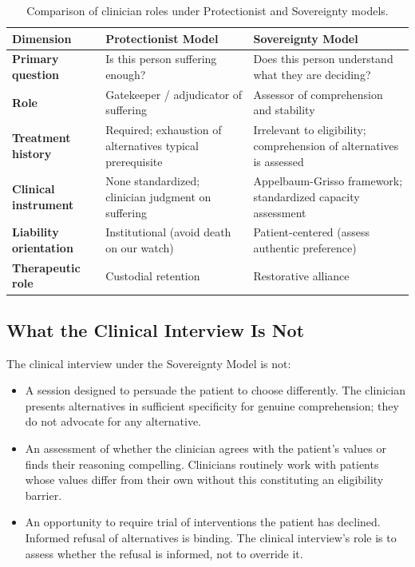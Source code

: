 \documentclass[11pt, letterpaper]{article}
\begin{document}
\begin{table}[h!]
\centering
\small
\renewcommand{\arraystretch}{1.5}
\begin{tabularx}{\textwidth}{>{\sffamily\bfseries\small}p{3.2cm} X X}
\toprule
\rowcolor{C@accent}
{\color{white}\sffamily\bfseries Dimension} &
{\color{white}\sffamily\bfseries Protectionist Model} &
{\color{white}\sffamily\bfseries Sovereignty Model} \\
\midrule
Primary question
  & Is this person suffering enough?
  & Does this person understand what they are deciding? \\
\rowcolor{C@accentlight}
Role
  & Gatekeeper / adjudicator of suffering
  & Assessor of comprehension and stability \\
Treatment history
  & Required; exhaustion of alternatives typical prerequisite
  & Irrelevant to eligibility; comprehension of alternatives is assessed \\
\rowcolor{C@accentlight}
Clinical instrument
  & None standardized; clinician judgment on suffering
  & Appelbaum-Grisso framework; standardized capacity assessment \\
Liability orientation
  & Institutional (avoid death on our watch)
  & Patient-centered (assess authentic preference) \\
\rowcolor{C@accentlight}
Therapeutic role
  & Custodial retention
  & Restorative alliance \\
\bottomrule
\end{tabularx}
\caption{Comparison of clinician roles under Protectionist and Sovereignty models.}
\end{table}

\subsection{What the Clinical Interview Is Not}

The clinical interview under the Sovereignty Model is not:

\begin{itemize}
  \item A session designed to persuade the patient to choose differently. The clinician
    presents alternatives in sufficient specificity for genuine comprehension; they do
    not advocate for any alternative.
  \item An assessment of whether the clinician agrees with the patient's values or
    finds their reasoning compelling. Clinicians routinely work with patients whose
    values differ from their own without this constituting an eligibility barrier.
  \item An opportunity to require trial of interventions the patient has declined.
    Informed refusal of alternatives is binding. The clinical interview's role is
    to assess whether the refusal is informed, not to override it.
\end{itemize}
\end{document}
